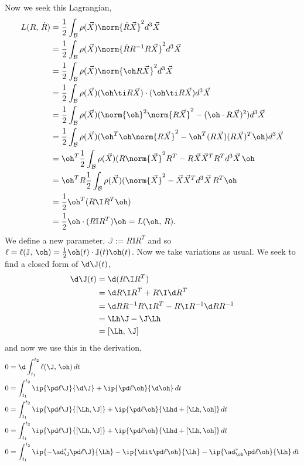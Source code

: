 \noindent
Now we seek this Lagrangian,
\begin{align*}
  L(R,\,\dot R) &= \frac{1}{2}\int_{\mathcal{B}}\rho(\vec X)\norm{\dot R \vec X}^2d^3\vec X\\
  &= \frac{1}{2}\int_{\mathcal{B}}\rho(\vec X)\norm{\dot RR^{-1}R \vec X}^2d^3\vec X\\
  &= \frac{1}{2}\int_{\mathcal{B}}\rho(\vec X)\norm{\oh R \vec X}^2d^3\vec X\\
  &= \frac{1}{2}\int_{\mathcal{B}}\rho(\vec X)(\oh \ti R\vec X) \cdot (\oh \ti R\vec X)d^3\vec X\\
  &= \frac{1}{2}\int_\mathcal{B}\rho(\vec X) (\norm{\oh}^2\norm{R\vec X}^2 - (\oh \cdot R\vec X)^2)d^3\vec X\\
  &= \frac{1}{2}\int_\mathcal{B}\rho(\vec X) (\oh^T \oh\norm{R\vec X}^2 - \oh^T (R\vec X)(R\vec X)^T\oh )d^3\vec X\\
  &= \oh^T\frac{1}{2}\int_\mathcal{B}\rho(\vec X) (R\norm{\vec X}^2 R^T - R\vec X\vec X^T R^T d^3\vec X \,\oh\\
  &= \oh^TR\frac{1}{2}\int_\mathcal{B}\rho(\vec X) (\norm{\vec X}^2 - \vec X\vec X^T d^3\vec X \,R^T\oh\\
  &= \frac{1}{2}\oh^T (R\I R^T \oh) \\
  &= \frac{1}{2}\oh \cdot (R\mathbb{I} R^T)\oh = L(\oh,\,R).
\end{align*}
We define a new parameter, $\mathbb{J} := R\mathbb{I}R^T$ and so $\ell = \ell(\mathbb{J},\,\oh) = \frac{1}{2}\oh(t) \cdot \mathbb{J}(t) \oh(t)$. %
Now we take variations as usual. We seek to find a closed form of $\d\J(t)$,
\begin{align*}
  \d\J(t) &= \d(R\I R^T)\\
  &= \d R\I R^T + R\I \d R^T\\
  &= \d R R^{-1}R\I R^T - R\I R^{-1}\d R R^{-1}\\
  &= \Lh \J - \J \Lh\\
  &= [\Lh,\,\J]
\end{align*}
and now we use this in the derivation,
\begin{align*}
  0 &= \d\int_{t_1}^{t_2} \ell(\J,\,\oh)\,dt \\
  0 &= \int_{t_1}^{t_2}  \ip{\pd \ell \J}{\d \J} + \ip{\pd \ell {\oh}}{\d \oh}\,dt\\
  0 &= \int_{t_1}^{t_2}  \ip{\pd \ell \J}{[\Lh, \J]} + \ip{\pd \ell {\oh}}{\Lhd + [\Lh, \oh]}\,dt\\
  0 &= \int_{t_1}^{t_2}  \ip{\pd \ell \J}{[\Lh, \J]} + \ip{\pd \ell {\oh}}{\Lhd + [\Lh, \oh]}\,dt\\
  0 &= \int_{t_1}^{t_2} \ip{-\ad_\J^* \pd \ell \J}{\Lh} - \ip{\dit \pd \ell {\oh}}{\Lh} - \ip{\ad_{\oh}^* \pd \ell \oh}{\Lh}\,dt
\end{align*}
